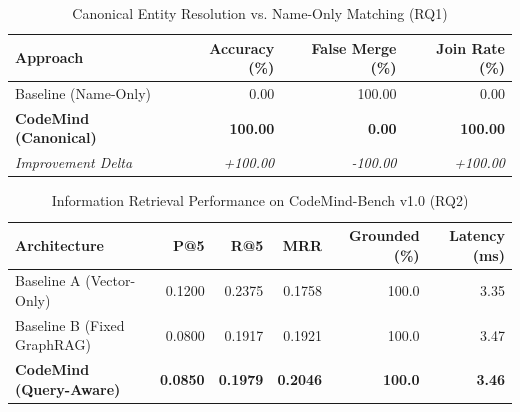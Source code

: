 
\begin{table}[htbp]
\caption{Canonical Entity Resolution vs. Name-Only Matching (RQ1)}
\label{tab:entity_resolution}
\centering
\begin{tabular}{lrrr}
\hline
\textbf{Approach} & \textbf{Accuracy (\%)} & \textbf{False Merge (\%)} & \textbf{Join Rate (\%)} \\
\hline
Baseline (Name-Only) & 0.00 & 100.00 & 0.00 \\
\textbf{CodeMind (Canonical)} & \textbf{100.00} & \textbf{0.00} & \textbf{100.00} \\
\hline
\textit{Improvement Delta} & \textit{+100.00} & \textit{-100.00} & \textit{+100.00} \\
\hline
\end{tabular}
\end{table}

\begin{table}[htbp]
\caption{Information Retrieval Performance on CodeMind-Bench v1.0 (RQ2)}
\label{tab:retrieval_performance}
\centering
\begin{tabular}{lrrrrr}
\hline
\textbf{Architecture} & \textbf{P@5} & \textbf{R@5} & \textbf{MRR} & \textbf{Grounded (\%)} & \textbf{Latency (ms)} \\
\hline
Baseline A (Vector-Only) & 0.1200 & 0.2375 & 0.1758 & 100.0 & 3.35 \\
Baseline B (Fixed GraphRAG) & 0.0800 & 0.1917 & 0.1921 & 100.0 & 3.47 \\
\textbf{CodeMind (Query-Aware)} & \textbf{0.0850} & \textbf{0.1979} & \textbf{0.2046} & \textbf{100.0} & \textbf{3.46} \\
\hline
\end{tabular}
\end{table}

